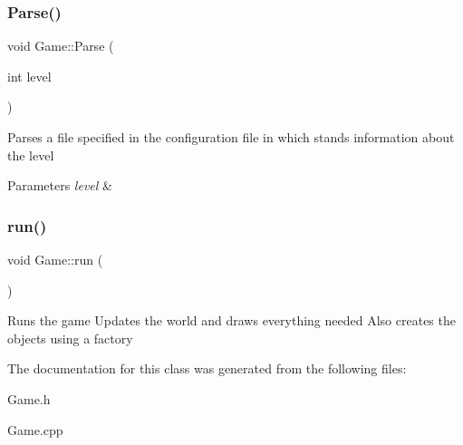 \subsubsection{\texorpdfstring{Parse()}{Parse()}}
{\footnotesize\ttfamily void Game\+::\+Parse (\begin{DoxyParamCaption}\item[{int}]{level }\end{DoxyParamCaption})}

Parses a file specified in the configuration file in which stands information about the level 
\begin{DoxyParams}{Parameters}
{\em level} & \\
\hline
\end{DoxyParams}
\mbox{\label{classGame_a1ab78f5ed0d5ea879157357cf2fb2afa}} 
\subsubsection{\texorpdfstring{run()}{run()}}
{\footnotesize\ttfamily void Game\+::run (\begin{DoxyParamCaption}{ }\end{DoxyParamCaption})}

Runs the game Updates the world and draws everything needed Also creates the objects using a factory 

The documentation for this class was generated from the following files\+:\begin{DoxyCompactItemize}
\item 
Game.\+h\item 
Game.\+cpp\end{DoxyCompactItemize}
